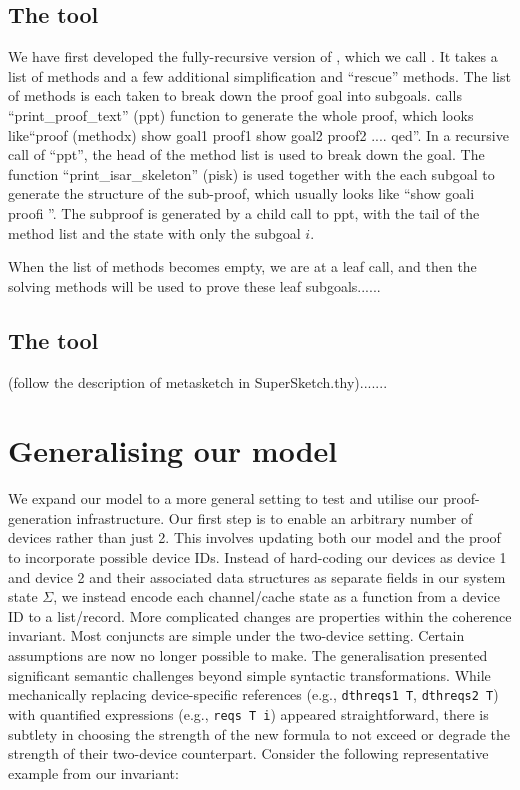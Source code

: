 \documentclass[10pt,conference]{IEEEtran}
\begin{document}
\subsection{The tool \doublesketch{}}
We have first developed the fully-recursive version of \supersketch{}, which we call \doublesketch{}. It takes a list of methods and a few additional simplification and ``rescue'' methods. The list of methods is each taken to break down the proof goal into subgoals. \doublesketch{} calls ``print\_proof\_text'' (ppt) function to generate the whole proof, which looks like``proof (methodx) show goal1 proof1 show goal2 proof2 .... qed''. In a recursive call of ``ppt'', the head of the method list is used to break down the goal. The function ``print\_isar\_skeleton'' (pisk) is used together with the each subgoal to generate the structure of the sub-proof, which usually looks like ``show goali proofi ''. The subproof is generated by a child call to ppt, with the tail of the method list and the state with only the subgoal $i$.

When the list of methods becomes empty, we are at a leaf call, and then the solving methods will be used to prove these leaf subgoals......

\subsection{The tool \metasketch{}}
(follow the description of metasketch in SuperSketch.thy).......

\section{Generalising our model}
We expand our model to a more general setting to test and utilise our proof-generation infrastructure. Our first step is to enable an arbitrary number of devices rather than just 2. This involves updating both our model and the proof to incorporate possible device IDs.
Instead of hard-coding our devices as device 1 and device 2 and their associated data structures as separate fields in our system state $\Sigma$, we instead encode each channel/cache state as a function from a device ID to a list/record.
More complicated changes are properties within the coherence invariant. Most conjuncts are simple under the two-device setting. Certain assumptions are now no longer possible to make. 
The generalisation presented significant semantic challenges beyond simple syntactic transformations. While mechanically replacing device-specific references (e.g., \texttt{dthreqs1~T}, \texttt{dthreqs2~T}) with quantified expressions (e.g., \texttt{reqs~T~i}) appeared straightforward, there is subtlety in choosing the strength of the new formula to not exceed or degrade the strength of their two-device counterpart.
Consider the following representative example from our invariant:
\end{document}
